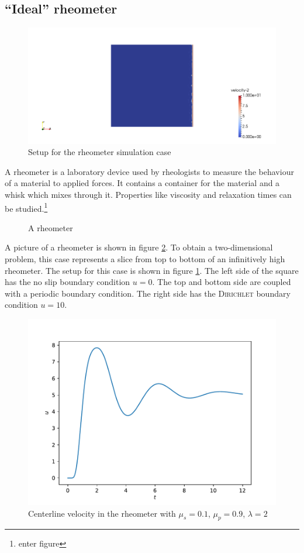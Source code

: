 \documentclass[12pt,a4paper,twoside, open=right]{scrreprt}
\theoremstyle{definition}
\theoremstyle{plain}
\begin{document}
\subsection{\enquote{Ideal} rheometer}
\begin{figure}
    \centering
    \includegraphics[width=\textwidth]{RheometerSetup}
    \caption{Setup for the rheometer simulation case}
    \label{fig:rheometersetup}
\end{figure}
A rheometer is a laboratory device used by rheologists to measure the behaviour of a material to applied forces. It contains a container for the material and a whisk which mixes through it. Properties like viscosity and relaxation times can be studied.\footnote{enter figure} 
\begin{figure}
    \caption{A rheometer}
    \label{fig:rheometer}
\end{figure}
A picture of a rheometer is shown in figure \ref{fig:rheometer}. To obtain a two-dimensional problem, this case represents a slice from top to bottom of an infinitively high rheometer.
The setup for this case is shown in figure \ref{fig:rheometersetup}. The left side of the square has the no slip boundary condition $u=0$. The top and bottom side are coupled with a periodic boundary condition. The right side has the \textsc{Dirichlet} boundary condition $u=10$. 
\begin{figure}
    \centering
    \includegraphics[width=\textwidth]{RheometerCenterline}
    \caption{Centerline velocity in the rheometer with $\mu_s=0.1$, $\mu_p=0.9$, $\lambda=2$ }
    \label{fig:rheomcenter}
\end{figure} 
\end{document}

